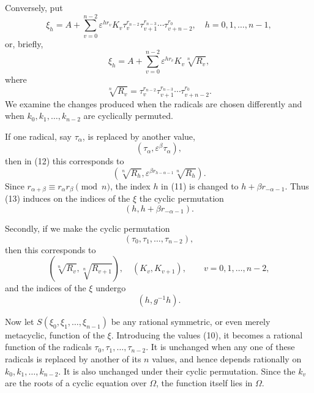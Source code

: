 \documentclass[11pt]{article}
\begin{document}
Conversely, put
\begin{equation}\tag{10}
  \xi_h=A+
  \sum_{v=0}^{n-2}\varepsilon^{hr_v}K_v\tau_v^{r_{n-2}}\tau_{v+1}^{r_{n-3}}\cdots\tau_{v+n-2}^{r_0},
  \quad h=0,1,\ldots,n-1,
\end{equation}
or, briefly,
\begin{equation}\tag{11}
  \xi_h=A+
  \sum_{v=0}^{n-2}\varepsilon^{hr_v}K_v\sqrt[n]{R_v},
\end{equation}
where
\begin{equation}\tag{12}
  \sqrt[n]{R_v}=\tau_v^{r_{n-2}}\tau_{v+1}^{r_{n-3}}\cdots\tau_{v+n-2}^{r_0}.
\end{equation}
We examine the changes produced when the radicals are chosen differently and when $k_0,k_1,\ldots,k_{n-2}$ are cyclically permuted.

If one radical, say $\tau_\alpha$, is replaced by another value,
\begin{equation}\tag{13}
  (\tau_\alpha,\varepsilon^\beta\tau_\alpha),
\end{equation}
then in (12) this corresponds to
\begin{equation}\tag{14}
  (\sqrt[n]{R_h},\varepsilon^{\beta r_{h-\alpha-1}}\sqrt[n]{R_h}).
\end{equation}
Since $r_{\alpha+\beta}\equiv r_\alpha r_\beta\pmod n$, the index $h$ in (11) is changed to $h+\beta r_{-\alpha-1}$. Thus (13) induces on the indices of the $\xi$ the cyclic permutation
\[
  (h,h+\beta r_{-\alpha-1}).
\]

Secondly, if we make the cyclic permutation
\begin{equation}\tag{15}
  (\tau_0,\tau_1,\ldots,\tau_{n-2}),
\end{equation}
then this corresponds to
\begin{equation}\tag{16}
  (\sqrt[n]{R_v},\sqrt[n]{R_{v+1}}),\quad (K_v,K_{v+1}),\qquad
  v=0,1,\ldots,n-2,
\end{equation}
and the indices of the $\xi$ undergo
\[
  (h,g^{-1}h).
\]

Now let $S(\xi_0,\xi_1,\ldots,\xi_{n-1})$ be any rational symmetric, or even merely metacyclic, function of the $\xi$. Introducing the values (10), it becomes a rational function of the radicals $\tau_0,\tau_1,\ldots,\tau_{n-2}$. It is unchanged when any one of these radicals is replaced by another of its $n$ values, and hence depends rationally on $k_0,k_1,\ldots,k_{n-2}$. It is also unchanged under their cyclic permutation. Since the $k_v$ are the roots of a cyclic equation over $\Omega$, the function itself lies in $\Omega$.
\end{document}
